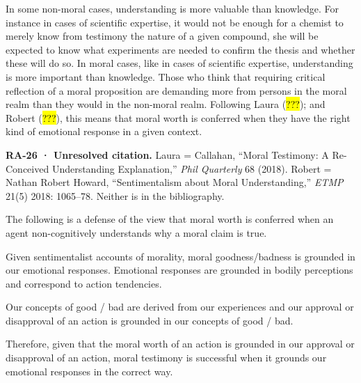 \documentclass[
  letterpaper,
  DIV=11,
  numbers=noendperiod]{scrartcl}
\theoremstyle{remark}
\begin{document}
In some non-moral cases, understanding is more valuable than knowledge.
For instance in cases of scientific expertise, it would not be enough
for a chemist to merely know from testimony the nature of a given
compound, she will be expected to know what experiments are needed to
confirm the thesis and whether these will do so. In moral cases, like in
cases of scientific expertise, understanding is more important than
knowledge. Those who think that requiring critical reflection of a moral
proposition are demanding more from persons in the moral realm than they
would in the non-moral realm. Following Laura (\hl{???}); and Robert
(\hl{???}), this means that moral worth is conferred when they have the
right kind of emotional response in a given context.

\begin{tcolorbox}[enhanced jigsaw, arc=.35mm, bottomrule=.15mm, bottomtitle=1mm, breakable, colback=white, colbacktitle=quarto-callout-warning-color!10!white, colframe=quarto-callout-warning-color-frame, coltitle=black, left=2mm, leftrule=.75mm, opacityback=0, opacitybacktitle=0.6, rightrule=.15mm, title=\textcolor{quarto-callout-warning-color}{\faExclamationTriangle}\hspace{0.5em}{Warning}, titlerule=0mm, toprule=.15mm, toptitle=1mm]

\textbf{RA-26 · Unresolved citation.} Laura = Callahan, ``Moral
Testimony: A Re-Conceived Understanding Explanation,'' \emph{Phil
Quarterly} 68 (2018). Robert = Nathan Robert Howard, ``Sentimentalism
about Moral Understanding,'' \emph{ETMP} 21(5) 2018: 1065--78. Neither
is in the bibliography.

\end{tcolorbox}

The following is a defense of the view that moral worth is conferred
when an agent non-cognitively understands why a moral claim is true.

Given sentimentalist accounts of morality, moral goodness/badness is
grounded in our emotional responses. Emotional responses are grounded in
bodily perceptions and correspond to action tendencies.

Our concepts of good / bad are derived from our experiences and our
approval or disapproval of an action is grounded in our concepts of good
/ bad.

Therefore, given that the moral worth of an action is grounded in our
approval or disapproval of an action, moral testimony is successful when
it grounds our emotional responses in the correct way.
\end{document}
